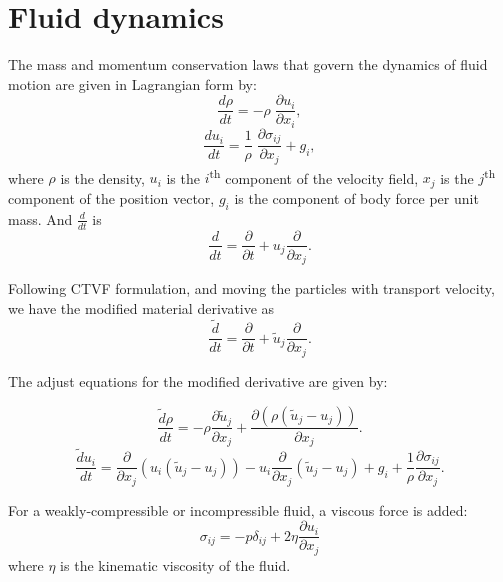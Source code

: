 \documentclass[preprint,12pt]{elsarticle}
\newcommand{\todoin}{\todo[inline]}
\begin{document}
\FloatBarrier%
\section{Fluid dynamics}
\label{sec:fluid-dynamics}

\todoin{Connor FSI}

The mass and momentum conservation laws that govern the dynamics of fluid motion are given in Lagrangian form by:
\begin{equation}
  \label{eq:ce}
  \frac{d \rho}{d t} = - \rho \; \frac{\partial u_i}{\partial x_i},
\end{equation}
\begin{equation}
  \label{eq:me}
  \frac{d u_i}{d t} = \frac{1}{\rho} \; \frac{\partial \sigma_{ij}}{\partial x_j}
  + g_i,
\end{equation}
where $\rho$ is the density, $u_i$ is the $i$\textsuperscript{th} component of
the velocity field, $x_j$ is the $j$\textsuperscript{th} component of the
position vector, $g_i$ is the component of body force per unit mass. And $\frac{d}{d t}$ is
\begin{equation}
  \label{eq:material-derivative}
  \frac{d}{d t} = \frac{\partial }{\partial t} +
  {u}_j \frac{\partial }{\partial x_j}.
\end{equation}


Following CTVF formulation, and moving the particles with transport velocity,
we have the modified material derivative as
\begin{equation}
  \label{eq:modified-material-derivative}
  \frac{\tilde{d} }{d t} = \frac{\partial }{\partial t} +
  \tilde{u}_j \frac{\partial }{\partial x_j}.
\end{equation}

The adjust equations for the modified derivative are given by:

\begin{equation}
  \label{eq:ce-tvf}
  \frac{\tilde{d} \rho}{d t} =
  - \rho \frac{\partial \tilde{u}_j}{\partial x_j} +
  \frac{\partial (\rho (\tilde{u}_j - u_j))}{\partial x_j}.
\end{equation}
\begin{equation}
  \label{eq:mom-tvf}
  \frac{\tilde{d} u_i}{d t} =
  \frac{\partial}{\partial x_j} (u_i (\tilde{u}_j - u_j))
  - u_i \frac{\partial}{\partial x_j} (\tilde{u}_j - u_j)
  + g_i
  +\frac{1}{\rho} \frac{\partial \sigma_{ij}}{\partial x_j}.
\end{equation}

For a weakly-compressible or incompressible fluid, a viscous force is added:
\begin{equation}
  \label{eq:fluid-stress-decomposition}
  \sigma_{ij} = - p \delta_{ij} + 2 \eta \frac{\partial u_i}{\partial x_j}
\end{equation}
where $\eta$ is the kinematic viscosity of the fluid.
\end{document}
